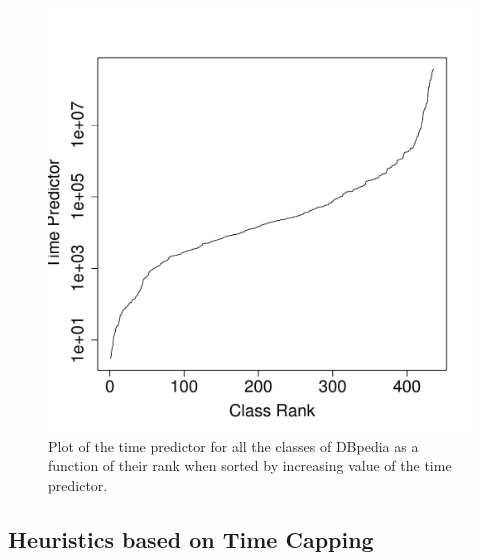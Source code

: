 \documentclass{sig-alternate}
\begin{document}
\begin{figure}[t]
\begin{center}
  \includegraphics[height=\plotheight]{tp}
\end{center}
\caption{Plot of the time predictor for all the classes of DBpedia as a function of
  their rank when sorted by increasing value of the time predictor.}
\label{fig:tp}
\end{figure}


\subsection{Heuristics based on Time Capping}
\end{document}
